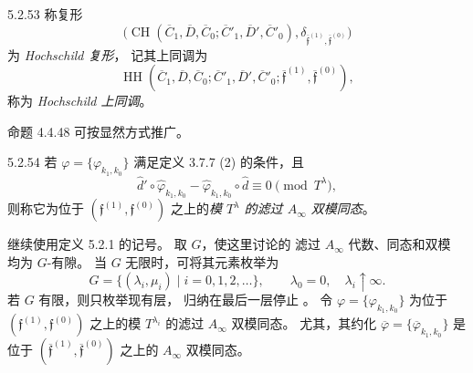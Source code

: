 \begin{definition}{5.2.53}\label{def:5-2-53}
称复形
\[
\bigl(
\operatorname{CH}
(\overline C_1,\overline D,\overline C_0;
 \overline C'_1,\overline D',\overline C'_0),
\delta_{\overline{\mathfrak f}^{(1)},
        \overline{\mathfrak f}^{(0)}}
\bigr)
\]
为 \emph{Hochschild 复形}，
记其上同调为
\[
\operatorname{HH}
(\overline C_1,\overline D,\overline C_0;
 \overline C'_1,\overline D',\overline C'_0;
 \overline{\mathfrak f}^{(1)},
 \overline{\mathfrak f}^{(0)}),
\]
称为 \emph{Hochschild 上同调}。
\end{definition}

命题 4.4.48 可按显然方式推广。

\begin{definition}{5.2.54}\label{def:5-2-54}
若 $\varphi=\{\varphi_{k_1,k_0}\}$
满足定义 3.7.7 (2) 的条件，且
\[
\widehat d'\circ
\widehat\varphi_{k_1,k_0}
-
\widehat\varphi_{k_1,k_0}
\circ\widehat d
\equiv0\pmod{T^\lambda},
\]
则称它为位于
$(\mathfrak f^{(1)},\mathfrak f^{(0)})$
之上的\emph{模 $T^\lambda$
的滤过 $A_\infty$ 双模同态}。
\end{definition}

继续使用定义 5.2.1 的记号。
取 $G$，使这里讨论的
滤过 $A_\infty$ 代数、同态和双模
均为 $G$-有隙。
当 $G$ 无限时，可将其元素枚举为
\[
G=\{(\lambda_i,\mu_i)
\mid i=0,1,2,\ldots\},
\qquad
\lambda_0=0,\quad
\lambda_i\uparrow\infty.
\]
若 $G$ 有限，则只枚举现有层，
归纳在最后一层停止
。
令
$\varphi=\{\varphi_{k_1,k_0}\}$
为位于
$(\mathfrak f^{(1)},\mathfrak f^{(0)})$
之上的模 $T^{\lambda_i}$
的滤过 $A_\infty$ 双模同态。
尤其，其约化
$\overline\varphi
=\{\overline\varphi_{k_1,k_0}\}$
是位于
$(\overline{\mathfrak f}^{(1)},
  \overline{\mathfrak f}^{(0)})$
之上的 $A_\infty$ 双模同态。

